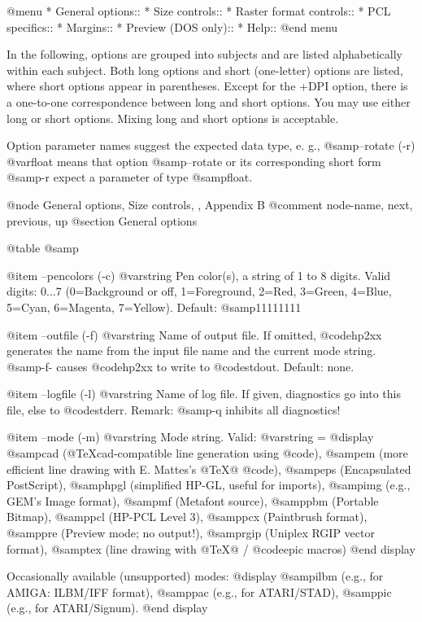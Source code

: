 @menu
* General options::
* Size controls::
* Raster format controls::
* PCL specifics::
* Margins::
* Preview (DOS only)::
* Help::
@end menu

In the following, options are grouped into subjects and
are listed alphabetically within each subject. Both long options and
short (one-letter) options are listed, where short options appear in
parentheses. Except for the +DPI option, there is a one-to-one correspondence
between long and short options. You may use either long or short options.
Mixing long and short options is acceptable.

Option parameter names suggest the expected data type, e. g.,
@samp{--rotate (-r) @var{float}} means that option @samp{--rotate} or its
corresponding short form @samp{-r} expect a parameter of type @samp{float}.

@node General options, Size controls, , Appendix B
@comment  node-name,  next,  previous,  up
@section General options

@table @samp

@item --pencolors (-c) @var{string}
Pen color(s), a string of 1 to 8 digits.
Valid digits: 0...7 (0=Background or off, 1=Foreground, 2=Red, 3=Green,
4=Blue, 5=Cyan, 6=Magenta, 7=Yellow). Default: @samp{11111111}

@item --outfile (-f) @var{string}
Name of output file. If omitted, @code{hp2xx} generates the name from
the input file name and the current mode string. @samp{-f-} causes
@code{hp2xx} to write to @code{stdout}. Default: none.

@item --logfile (-l) @var{string}
Name of log file. If given, diagnostics go into this file, else to
@code{stderr}. Remark: @samp{-q} inhibits all diagnostics!

@item --mode (-m) @var{string}
Mode string. Valid: @var{string} =
@display
  @samp{cad}  (@TeX{}cad-compatible line generation using @code{}),
  @samp{em}   (more efficient line drawing with E. Mattes's @TeX{}@ @code{}),
  @samp{eps}  (Encapsulated PostScript),
  @samp{hpgl} (simplified HP-GL, useful for imports),
  @samp{img}  (e.g., GEM's Image format),
  @samp{mf}   (Metafont source),
  @samp{pbm}  (Portable Bitmap),
  @samp{pcl}  (HP-PCL Level 3),
  @samp{pcx}  (Paintbrush format),
  @samp{pre}  (Preview mode; no output!),
  @samp{rgip} (Uniplex RGIP vector format),
  @samp{tex}  (line drawing with @TeX{}@ / @code{epic} macros)
@end display

Occasionally available (unsupported) modes:
@display
  @samp{ilbm} (e.g., for AMIGA: ILBM/IFF format),
  @samp{pac}  (e.g., for ATARI/STAD),
  @samp{pic}  (e.g., for ATARI/Signum).
@end display

